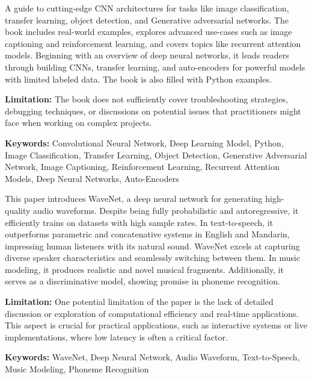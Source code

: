 { 
	A guide to cutting-edge CNN architectures for tasks like image classification, transfer learning, object detection, and Generative adversarial networks. The book \cite{Sewak:2018} includes real-world examples, explores advanced use-cases such as image captioning and reinforcement learning, and covers topics like recurrent attention models. Beginning with an overview of deep neural networks, it leads readers through building CNNs, transfer learning, and auto-encoders for powerful models with limited labeled data. The book is also filled with Python examples.
	
	\bigskip
	
	\textbf{Limitation:} The book does not sufficiently cover troubleshooting strategies, debugging techniques, or discussions on potential issues that practitioners might face when working on complex projects. 
	
	\scriptsize{\textbf{Keywords:} Convolutional Neural Network, Deep Learning Model, Python, Image Classification, Transfer Learning, Object Detection, Generative Adversarial Network, Image Captioning, Reinforcement Learning, Recurrent Attention Models, Deep Neural Networks, Auto-Encoders}
}


{ 
	
	This paper \cite{Oord:2016} introduces WaveNet, a deep neural network for generating high-quality audio waveforms. Despite being fully probabilistic and autoregressive, it efficiently trains on datasets with high sample rates. In text-to-speech, it outperforms parametric and concatenative systems in English and Mandarin, impressing human listeners with its natural sound. WaveNet excels at capturing diverse speaker characteristics and seamlessly switching between them. In music modeling, it produces realistic and novel musical fragments. Additionally, it serves as a discriminative model, showing promise in phoneme recognition.
	
	\bigskip
	
	\textbf{Limitation:} One potential limitation of the paper is the lack of detailed discussion or exploration of computational efficiency and real-time applications. This aspect is crucial for practical applications, such as interactive systems or live implementations, where low latency is often a critical factor. 
	
	\scriptsize{\textbf{Keywords:} WaveNet, Deep Neural Network, Audio Waveform, Text-to-Speech, Music Modeling, Phoneme Recognition}
}


